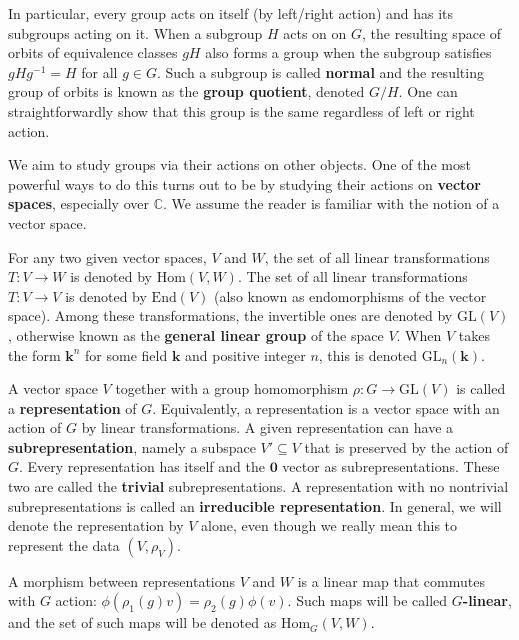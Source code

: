 		In particular, every group acts on itself (by left/right action) and has its subgroups acting on it. When a subgroup $H$ acts on on $G$, the resulting space of orbits of equivalence classes $g H$ also forms a group when the subgroup satisfies $g H g^{-1} = H$ for all $g \in G$. Such a subgroup is called \textbf{normal} and the resulting group of orbits is known as the \textbf{group quotient}, denoted $G/H$. One can straightforwardly show that this group is the same regardless of left or right action.
		
		We aim to study groups via their actions on other objects. One of the most powerful ways to do this turns out to be by studying their actions on \textbf{vector spaces}, especially over $\mathbb C$. We assume the reader is familiar with the notion of a vector space.
		
		For any two given vector spaces, $V$ and $W$, the set of all linear transformations $T: V \to W$ is denoted by $\mathrm{Hom}(V, W)$. The set of all linear transformations $T: V \to V$ is denoted by $\mathrm{End}(V)$ (also known as endomorphisms of the vector space). Among these transformations, the invertible ones are denoted by $\mathrm{GL}(V)$, otherwise known as the \textbf{general linear group} of the space $V$. When $V$ takes the form $\mathbf k^n$ for some field $\mathbf k$ and positive integer $n$, this is denoted $\mathrm{GL}_n(\mathbf k)$. 

		 A vector space $V$ together with a group homomorphism $\rho: G \to \mathrm{GL}(V)$ is called a \textbf{representation} of $G$. Equivalently, a representation is a vector space with an action of $G$ by linear transformations. A given representation can have a \textbf{subrepresentation}, namely a subspace $V' \subseteq V$ that is preserved by the action of $G$. Every representation has itself and the $\mathbf 0$ vector as subrepresentations. These two are called the \textbf{trivial} subrepresentations. A representation with no nontrivial subrepresentations is called an \textbf{irreducible representation}. In general, we will denote the representation by $V$ alone, even though we really mean this to represent the data $(V, \rho_V)$.
		 
		A morphism between representations $V$ and $W$ is a linear map that commutes with $G$ action: $\phi(\rho_1(g)  v) = \rho_2 (g) \phi (v)$. Such maps will be called $G$\textbf{-linear}, and the set of such maps will be denoted as $\mathrm{Hom}_G(V, W)$.
		 
